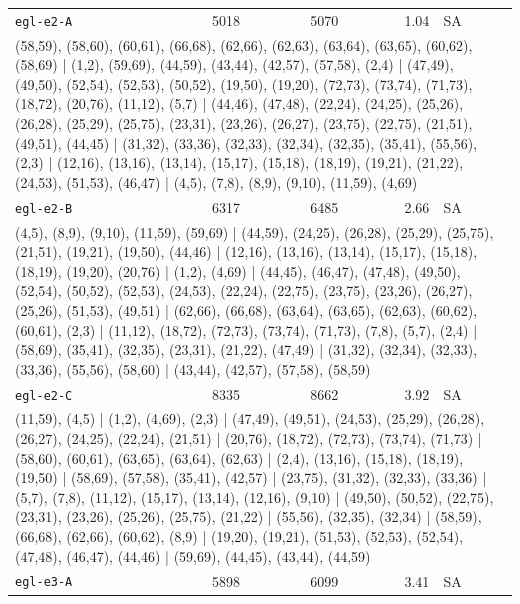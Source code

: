 \begin{longtable}{lrrrl}
\texttt{egl-e2-A} & 5018 & 5070 & 1.04 & SA \\
\multicolumn{5}{p{0.96\linewidth}}{\tiny\raggedright\arraybackslash (58,59), (58,60), (60,61), (66,68), (62,66), (62,63), (63,64), (63,65), (60,62), (58,69) | (1,2), (59,69), (44,59), (43,44), (42,57), (57,58), (2,4) | (47,49), (49,50), (52,54), (52,53), (50,52), (19,50), (19,20), (72,73), (73,74), (71,73), (18,72), (20,76), (11,12), (5,7) | (44,46), (47,48), (22,24), (24,25), (25,26), (26,28), (25,29), (25,75), (23,31), (23,26), (26,27), (23,75), (22,75), (21,51), (49,51), (44,45) | (31,32), (33,36), (32,33), (32,34), (32,35), (35,41), (55,56), (2,3) | (12,16), (13,16), (13,14), (15,17), (15,18), (18,19), (19,21), (21,22), (24,53), (51,53), (46,47) | (4,5), (7,8), (8,9), (9,10), (11,59), (4,69)} \\[2pt]
\texttt{egl-e2-B} & 6317 & 6485 & 2.66 & SA \\
\multicolumn{5}{p{0.96\linewidth}}{\tiny\raggedright\arraybackslash (4,5), (8,9), (9,10), (11,59), (59,69) | (44,59), (24,25), (26,28), (25,29), (25,75), (21,51), (19,21), (19,50), (44,46) | (12,16), (13,16), (13,14), (15,17), (15,18), (18,19), (19,20), (20,76) | (1,2), (4,69) | (44,45), (46,47), (47,48), (49,50), (52,54), (50,52), (52,53), (24,53), (22,24), (22,75), (23,75), (23,26), (26,27), (25,26), (51,53), (49,51) | (62,66), (66,68), (63,64), (63,65), (62,63), (60,62), (60,61), (2,3) | (11,12), (18,72), (72,73), (73,74), (71,73), (7,8), (5,7), (2,4) | (58,69), (35,41), (32,35), (23,31), (21,22), (47,49) | (31,32), (32,34), (32,33), (33,36), (55,56), (58,60) | (43,44), (42,57), (57,58), (58,59)} \\[2pt]
\texttt{egl-e2-C} & 8335 & 8662 & 3.92 & SA \\
\multicolumn{5}{p{0.96\linewidth}}{\tiny\raggedright\arraybackslash (11,59), (4,5) | (1,2), (4,69), (2,3) | (47,49), (49,51), (24,53), (25,29), (26,28), (26,27), (24,25), (22,24), (21,51) | (20,76), (18,72), (72,73), (73,74), (71,73) | (58,60), (60,61), (63,65), (63,64), (62,63) | (2,4), (13,16), (15,18), (18,19), (19,50) | (58,69), (57,58), (35,41), (42,57) | (23,75), (31,32), (32,33), (33,36) | (5,7), (7,8), (11,12), (15,17), (13,14), (12,16), (9,10) | (49,50), (50,52), (22,75), (23,31), (23,26), (25,26), (25,75), (21,22) | (55,56), (32,35), (32,34) | (58,59), (66,68), (62,66), (60,62), (8,9) | (19,20), (19,21), (51,53), (52,53), (52,54), (47,48), (46,47), (44,46) | (59,69), (44,45), (43,44), (44,59)} \\[2pt]
\texttt{egl-e3-A} & 5898 & 6099 & 3.41 & SA \\

\end{longtable}
